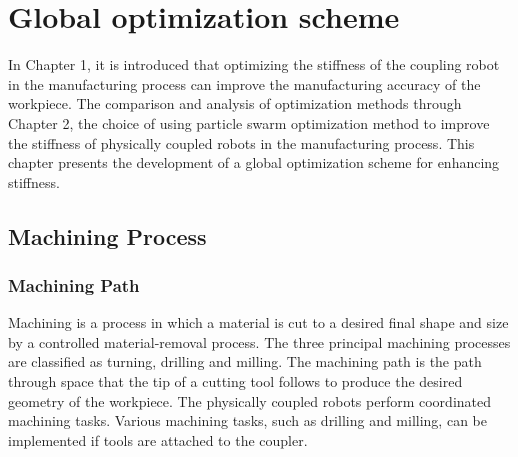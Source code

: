 \chapter{Global optimization scheme} \label{ch:scheme}
In Chapter 1, it is introduced that optimizing the stiffness of the coupling robot in the manufacturing process can improve the manufacturing accuracy of the workpiece. The comparison and analysis of optimization methods through Chapter 2, the choice of using particle swarm optimization method to improve the stiffness of physically coupled robots in the manufacturing process. This chapter presents the development of a global optimization scheme for enhancing stiffness.
\section{Machining Process} \label{sec:scheme:process}
\subsection{Machining Path} \label{subsec:sec:scheme:process:path}
Machining is a process in which a material is cut to a desired final shape and size by a controlled material-removal process. The three principal machining processes are classified as turning, drilling and milling. The machining path is the path through space that the tip of a cutting tool follows to produce the desired geometry of the workpiece. The physically coupled robots perform coordinated machining tasks. Various machining tasks, such as drilling and milling, can be implemented if tools are attached to the coupler. 
